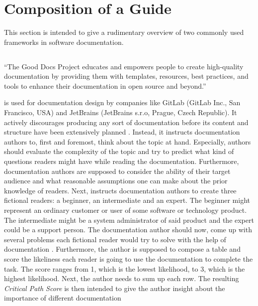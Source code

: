 \pagebreak
\section{Composition of a Guide}\label{s:guide-creation}
This section is intended to give a rudimentary overview of two commonly used frameworks in software documentation.


\subsection{\good}\label{s:b-gooddocs}
\begin{displayquote}
	``The Good Docs Project educates and empowers people to create high-quality documentation by providing them with templates, resources, best practices, and tools to enhance their documentation in open source and beyond.''
\end{displayquote}
\good\space is used for documentation design by companies like GitLab (GitLab Inc., San Francisco, USA) and JetBrains (JetBrains s.r.o, Prague, Czech Republic).
It actively discourages producing any sort of documentation before its content and structure have been extensively planned \cite{shorterGoodDocsProject2024}.
Instead, it instructs documentation authors to, first and foremost, think about the topic at hand.
Especially, authors should evaluate the complexity of the topic and try to predict what kind of questions readers might have while reading the documentation.
Furthermore, documentation authors are supposed to consider the ability of their target audience and what reasonable assumptions one can make about the prior knowledge of
readers.
Next, \good\space instructs documentation authors to create three fictional readers: a beginner, an intermediate and an expert.
The beginner might represent an ordinary customer or user of some software or technology product.
The intermediate might be a system administrator of said product
and the expert could be a support person.
The documentation author should now, come up with several problems each fictional reader would try to solve with the help of documentation \cite{shorterGoodDocsProject2024}.
Furthermore, the author is supposed to compose a table and score the likeliness each reader is
going to use the documentation to complete the task.
The score ranges from 1, which is the lowest likelihood, to 3, which is the highest likelihood.
Next, the author needs to sum up each row.
The resulting \textit{Critical Path Score} is then intended to give the author insight about the importance of different documentation

